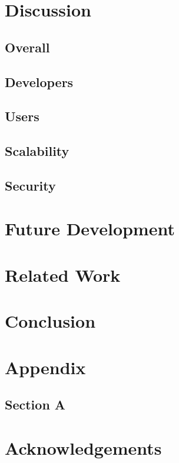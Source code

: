 \documentclass{sig-alternate}
\begin{document}
\section{Discussion}

\subsection{Overall}

\subsection{Developers}

\subsection{Users}

\subsection{Scalability}

\subsection{Security}

\section{Future Development}

\section{Related Work}

\section{Conclusion}

\section{Appendix}
\subsection{Section A}
  

\section{Acknowledgements}

\nocite{*}


\end{document}

